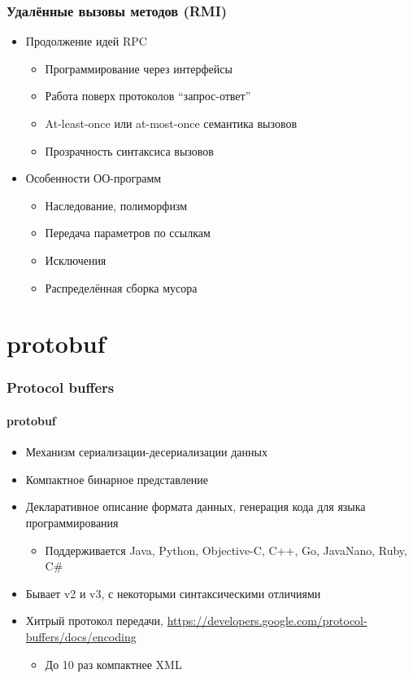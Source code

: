 \documentclass[xetex,mathserif,serif]{beamer}
\begin{document}
	\begin{frame}
		\frametitle{Удалённые вызовы методов (RMI)}
		\begin{itemize}
			\item Продолжение идей RPC
			\begin{itemize}
				\item Программирование через интерфейсы
				\item Работа поверх протоколов ``запрос-ответ''
				\item At-least-once или at-most-once семантика вызовов
				\item Прозрачность синтаксиса вызовов
			\end{itemize}
			\item Особенности ОО-программ
			\begin{itemize}
				\item Наследование, полиморфизм
				\item Передача параметров по ссылкам
				\item Исключения
				\item Распределённая сборка мусора
			\end{itemize}
		\end{itemize}
	\end{frame}

	\section{protobuf}

	\begin{frame}
		\frametitle{Protocol buffers}
		\framesubtitle{protobuf}
		\begin{itemize}
			\item Механизм сериализации-десериализации данных
			\item Компактное бинарное представление
			\item Декларативное описание формата данных, генерация кода для языка программирования
			\begin{itemize}
				\item Поддерживается Java, Python, Objective-C, C++, Go, JavaNano, Ruby, C\#
			\end{itemize}
			\item Бывает v2 и v3, с некоторыми синтаксическими отличиями
			\item Хитрый протокол передачи, \url{https://developers.google.com/protocol-buffers/docs/encoding}
			\begin{itemize}
				\item До 10 раз компактнее XML 
			\end{itemize}
		\end{itemize}
	\end{frame}
\end{document}

